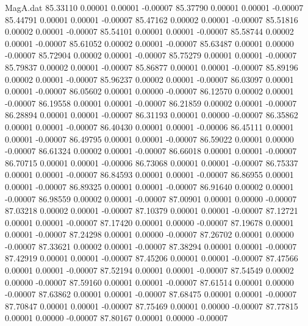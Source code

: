 \begin{filecontents}{MagA.dat}
  85.33110    0.00001    0.00001   -0.00007
  85.37790    0.00001    0.00001   -0.00007
  85.44791    0.00001    0.00001   -0.00007
  85.47162    0.00002    0.00001   -0.00007
  85.51816    0.00002    0.00001   -0.00007
  85.54101    0.00001    0.00001   -0.00007
  85.58744    0.00002    0.00001   -0.00007
  85.61052    0.00002    0.00001   -0.00007
  85.63487    0.00001    0.00000   -0.00007
  85.72904    0.00002    0.00001   -0.00007
  85.75279    0.00001    0.00001   -0.00007
  85.79837    0.00002    0.00001   -0.00007
  85.86877    0.00001    0.00001   -0.00007
  85.89196    0.00002    0.00001   -0.00007
  85.96237    0.00002    0.00001   -0.00007
  86.03097    0.00001    0.00001   -0.00007
  86.05602    0.00001    0.00000   -0.00007
  86.12570    0.00002    0.00001   -0.00007
  86.19558    0.00001    0.00001   -0.00007
  86.21859    0.00002    0.00001   -0.00007
  86.28894    0.00001    0.00001   -0.00007
  86.31193    0.00001    0.00000   -0.00007
  86.35862    0.00001    0.00001   -0.00007
  86.40430    0.00001    0.00001   -0.00006
  86.45111    0.00001    0.00001   -0.00007
  86.49795    0.00001    0.00001   -0.00007
  86.59022    0.00001    0.00000   -0.00007
  86.61324    0.00002    0.00001   -0.00007
  86.66018    0.00001    0.00001   -0.00007
  86.70715    0.00001    0.00001   -0.00006
  86.73068    0.00001    0.00001   -0.00007
  86.75337    0.00001    0.00001   -0.00007
  86.84593    0.00001    0.00001   -0.00007
  86.86955    0.00001    0.00001   -0.00007
  86.89325    0.00001    0.00001   -0.00007
  86.91640    0.00002    0.00001   -0.00007
  86.98559    0.00002    0.00001   -0.00007
  87.00901    0.00001    0.00000   -0.00007
  87.03218    0.00002    0.00001   -0.00007
  87.10379    0.00001    0.00001   -0.00007
  87.12721    0.00001    0.00001   -0.00007
  87.17420    0.00001    0.00000   -0.00007
  87.19678    0.00001    0.00001   -0.00007
  87.24298    0.00001    0.00000   -0.00007
  87.26702    0.00001    0.00000   -0.00007
  87.33621    0.00002    0.00001   -0.00007
  87.38294    0.00001    0.00001   -0.00007
  87.42919    0.00001    0.00001   -0.00007
  87.45206    0.00001    0.00001   -0.00007
  87.47566    0.00001    0.00001   -0.00007
  87.52194    0.00001    0.00001   -0.00007
  87.54549    0.00002    0.00000   -0.00007
  87.59160    0.00001    0.00001   -0.00007
  87.61514    0.00001    0.00000   -0.00007
  87.63862    0.00001    0.00001   -0.00007
  87.68475    0.00001    0.00001   -0.00007
  87.70847    0.00001    0.00001   -0.00007
  87.75469    0.00001    0.00000   -0.00007
  87.77815    0.00001    0.00000   -0.00007
  87.80167    0.00001    0.00000   -0.00007

\end{filecontents}
